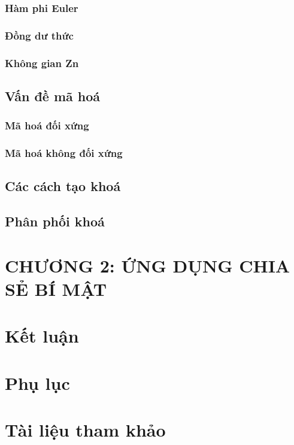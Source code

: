 \documentclass[12pt,a4paper]{report}
\begin{document}
\subsection{Hàm phi Euler}
\subsection{Đồng dư thức}
\subsection{Không gian Zn}
\section{Vấn đề mã hoá}
\subsection{Mã hoá đối xứng}
\subsection{Mã hoá không đối xứng}
\section{Các cách tạo khoá}
\section{Phân phối khoá}
\chapter{CHƯƠNG 2: ỨNG DỤNG CHIA SẺ BÍ MẬT}
\chapter*{Kết luận}
\chapter*{Phụ lục}
\chapter*{Tài liệu tham khảo}
\end{document}
